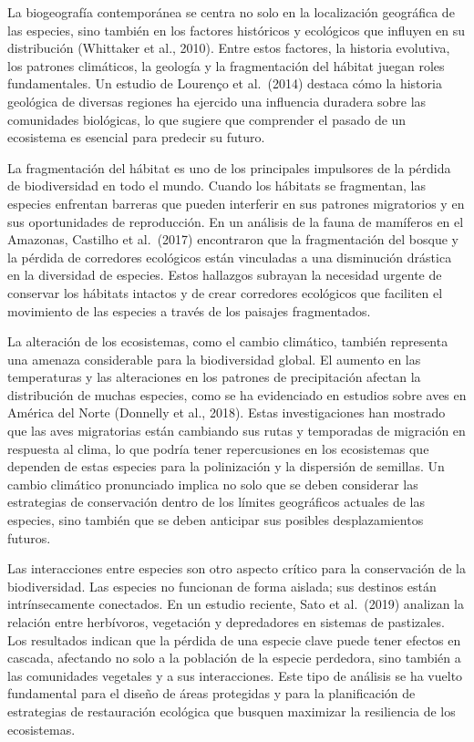 \documentclass[
  letterpaper,
  DIV=11,
  numbers=noendperiod,
  oneside]{scrreprt}
\begin{document}
La biogeografía contemporánea se centra no solo en la localización
geográfica de las especies, sino también en los factores históricos y
ecológicos que influyen en su distribución (Whittaker et al., 2010).
Entre estos factores, la historia evolutiva, los patrones climáticos, la
geología y la fragmentación del hábitat juegan roles fundamentales. Un
estudio de Lourenço et al.~(2014) destaca cómo la historia geológica de
diversas regiones ha ejercido una influencia duradera sobre las
comunidades biológicas, lo que sugiere que comprender el pasado de un
ecosistema es esencial para predecir su futuro.

La fragmentación del hábitat es uno de los principales impulsores de la
pérdida de biodiversidad en todo el mundo. Cuando los hábitats se
fragmentan, las especies enfrentan barreras que pueden interferir en sus
patrones migratorios y en sus oportunidades de reproducción. En un
análisis de la fauna de mamíferos en el Amazonas, Castilho et al.~(2017)
encontraron que la fragmentación del bosque y la pérdida de corredores
ecológicos están vinculadas a una disminución drástica en la diversidad
de especies. Estos hallazgos subrayan la necesidad urgente de conservar
los hábitats intactos y de crear corredores ecológicos que faciliten el
movimiento de las especies a través de los paisajes fragmentados.

La alteración de los ecosistemas, como el cambio climático, también
representa una amenaza considerable para la biodiversidad global. El
aumento en las temperaturas y las alteraciones en los patrones de
precipitación afectan la distribución de muchas especies, como se ha
evidenciado en estudios sobre aves en América del Norte (Donnelly et
al., 2018). Estas investigaciones han mostrado que las aves migratorias
están cambiando sus rutas y temporadas de migración en respuesta al
clima, lo que podría tener repercusiones en los ecosistemas que dependen
de estas especies para la polinización y la dispersión de semillas. Un
cambio climático pronunciado implica no solo que se deben considerar las
estrategias de conservación dentro de los límites geográficos actuales
de las especies, sino también que se deben anticipar sus posibles
desplazamientos futuros.

Las interacciones entre especies son otro aspecto crítico para la
conservación de la biodiversidad. Las especies no funcionan de forma
aislada; sus destinos están intrínsecamente conectados. En un estudio
reciente, Sato et al.~(2019) analizan la relación entre herbívoros,
vegetación y depredadores en sistemas de pastizales. Los resultados
indican que la pérdida de una especie clave puede tener efectos en
cascada, afectando no solo a la población de la especie perdedora, sino
también a las comunidades vegetales y a sus interacciones. Este tipo de
análisis se ha vuelto fundamental para el diseño de áreas protegidas y
para la planificación de estrategias de restauración ecológica que
busquen maximizar la resiliencia de los ecosistemas.
\end{document}
